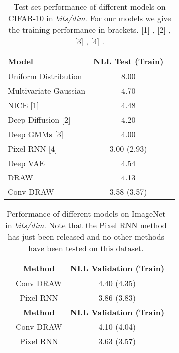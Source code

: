 \documentclass{article}
\begin{document}
\begin{table}[h]
\vspace{-0.3cm}
\caption{Test set performance of different models on CIFAR-10 in \emph{bits/dim}. For our models we give the training performance in brackets. [1] \cite{dinh2014nice}, [2] \cite{sohl2015deep}, [3] \cite{van2014factoring}, [4] \citep{oord2016pixel}.}
\vspace{0.4cm}
\centering
	\begin{tabular}{lcc}
		\hline
		\textbf{Model} & \textbf{NLL Test (Train)}  \\ 
		\hline
		Uniform Distribution & 8.00 \\ 
		Multivariate Gaussian & 4.70 \\ 
		NICE [1] & 4.48 \\ 
		Deep Diffusion [2] & 4.20 \\ 
		Deep GMMs [3] & 4.00 \\ 
Pixel RNN [4] & 3.00 (2.93) \\
		\hline
		Deep VAE &  4.54 \\
		DRAW  &  4.13 \\
		\hline
		Conv DRAW &  3.58 (3.57) \\
	   	\hline
	\end{tabular}
\label{table:cifar10}
\vspace{-0.3cm}
\end{table}

\begin{table}[h]
\vspace{-0.3cm}
\caption{Performance of different models on ImageNet in \emph{bits/dim}. Note that the Pixel RNN method has just been released and no other methods have been tested on this dataset.}
\vspace{0.4cm}
\centering
	\begin{tabular}{lcc}
		\hline
		\textbf{} & \textbf{Method} & \textbf{NLL Validation (Train)}  \\ 
		\hline
		& Conv DRAW &  4.40 (4.35) \\
		& Pixel RNN & 3.86 (3.83) \\ 
		\hline
		\textbf{} & \textbf{Method} & \textbf{NLL Validation (Train)}  \\ 
		\hline
		& Conv DRAW &  4.10 (4.04) \\
		& Pixel RNN & 3.63 (3.57) \\ 
	   	\hline
	\end{tabular}
\label{table:imageNet}
\end{table}
\end{document}
